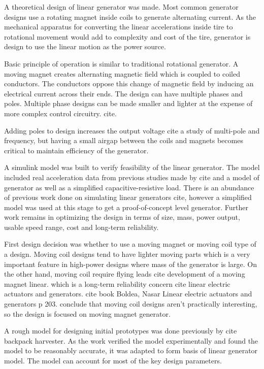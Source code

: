 A theoretical design of linear generator was made. Most common generator designs use a rotating magnet inside coils to generate alternating current. As the mechanical apparatus for converting the linear accelerations inside tire to rotational movement would add to complexity and cost of the tire, generator is design to use the linear motion as the power source.

Basic principle of operation is similar to traditional rotational generator. A moving magnet creates alternating magnetic field which is coupled to coiled conductors. The conductors oppose this change of magnetic field by inducing an electrical current across their ends. The design can have multiple phases and poles. Multiple phase designs can be made smaller and lighter at the expense of more complex control circuitry. {\color{red} cite}. 

Adding poles to design increases the output voltage {\color{red} cite a study of multi-pole} and frequency, but having a small airgap between the coils and magnets becomes critical to maintain efficiency of the generator. 

A simulink model was built to verify feasibility of the linear generator. The model included real acceleration data from previous studies made by {\color{red} cite} and a model of generator as well as a simplified capacitive-resistive load. There is an abundance of previous work done on simulating linear generators  {\color{red} cite}, however a simplified model was used at this stage to get a proof-of-concept level generator. Further work remains in optimizing the design in terms of size, mass, power output, usable speed range, cost and long-term reliability.

First design decision was whether to use a moving magnet or moving coil type of a design. Moving coil designs tend to have lighter moving parts which is a very important feature in high-power designs where mass of the generator is large. On the other hand, moving coil require flying leads  {\color{red} cite development of a moving magnet linear}.  which is a long-term reliability concern  {\color{red} cite linear electric actuators and generators}.  {\color{red} cite book Boldea, Nasar Linear electric actuators and generators p 203}. conclude that moving coil designs aren't practically interesting, so the design is focused on moving magnet generator. 

A rough model for designing initial prototypes was done previously by  {\color{red} cite backpack harvester}. As the work verified the model experimentally and found the model to be reasonably accurate, it was adapted to form basis of linear generator model. The model can account for most of the key design parameters. 

